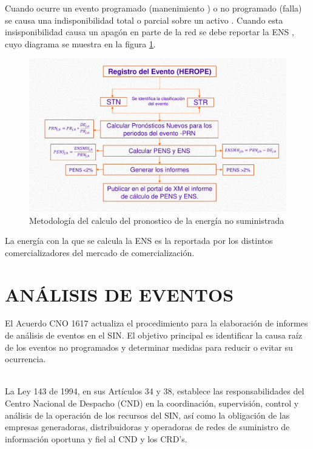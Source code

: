\documentclass[a5paper]{book}%
\begin{document}
Cuando ocurre un evento programado (manenimiento ) o no programado (falla) se causa una
indisponibilidad total o parcial  sobre un activo \cite{CREG0942012}. Cuando esta
insisponibilidad causa un apagón en parte de la red se debe reportar la
 \ac{ENS} \cite{CREG0152018}, cuyo diagrama se muestra en la figura \ref{fig:ens}.

\begin{figure}[H]
  \centering
  \caption{Metodología del calculo del pronostico de la energía no
    suministrada}
  \label{fig:ens}
  \includegraphics[width=\linewidth]{calculo_ens.png}
\end{figure}


La energía con la que se calcula la \ac{ENS} es la reportada por los
distintos comercializadores del mercado de comercialización.

  \section{ANÁLISIS DE EVENTOS}

El Acuerdo CNO 1617 actualiza el procedimiento para la elaboración de informes de análisis de eventos en el \ac{SIN}. El objetivo principal es identificar la causa raíz de los eventos no programados y determinar medidas para reducir o evitar su ocurrencia.\\\\

\begin{center}
\begin{tcolorbox}
La Ley 143 de 1994, en sus Artículos 34 y 38, establece las responsabilidades del Centro Nacional de Despacho (CND) en la coordinación, supervisión, control y análisis de la operación de los recursos del SIN, así como la obligación de las empresas generadoras, distribuidoras y operadoras de redes de suministro de información oportuna y fiel al CND y los CRD's.
\end{tcolorbox}
\end{center}
\end{document}
